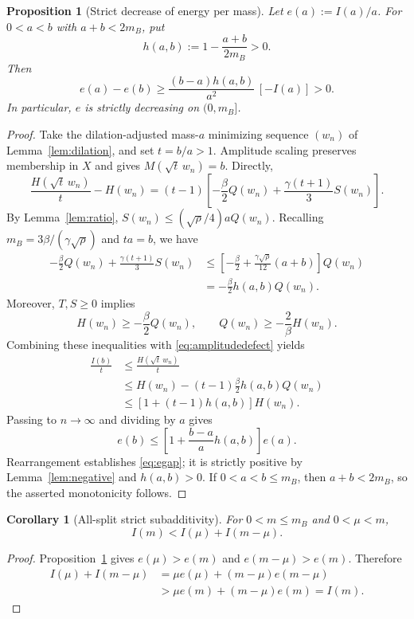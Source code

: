 \documentclass[11pt]{article}
\numberwithin{equation}{section}
\newtheorem{proposition}[theorem]{Proposition}
\newtheorem{corollary}[theorem]{Corollary}
\theoremstyle{remark}
\begin{document}
\begin{proposition}[Strict decrease of energy per mass]
\label{prop:decrease}
Let $e(a):=I(a)/a$.  For $0<a<b$ with $a+b<2m_B$,
put
\[
h(a,b):=1-\frac{a+b}{2m_B}>0.
\]
Then
\begin{equation}\label{eq:egap}
e(a)-e(b)\ge
\frac{(b-a)h(a,b)}{a^2}\,[-I(a)]>0.
\end{equation}
In particular, $e$ is strictly decreasing on $(0,m_B]$.
\end{proposition}
\begin{proof}
Take the dilation-adjusted mass-$a$ minimizing sequence $(w_n)$ of
Lemma~\ref{lem:dilation}, and set $t=b/a>1$.
Amplitude scaling preserves membership in $X$ and gives
$M(\sqrt t\,w_n)=b$.  Directly,
\begin{equation}\label{eq:amplitudedefect}
\frac{H(\sqrt t\,w_n)}{t}-H(w_n)
=(t-1)\left[-\frac{\beta}{2}Q(w_n)
+\frac{\gamma(t+1)}{3}S(w_n)\right].
\end{equation}
By Lemma~\ref{lem:ratio}, $S(w_n)\le (\sqrt\rho/4)aQ(w_n)$.
Recalling $m_B=3\beta/(\gamma\sqrt\rho)$ and $ta=b$, we have
\begin{align*}
-\frac{\beta}{2}Q(w_n)+\frac{\gamma(t+1)}3S(w_n)
&\le\left[-\frac{\beta}{2}
+\frac{\gamma\sqrt\rho}{12}(a+b)\right]Q(w_n)\\
&=-\frac{\beta}{2}h(a,b)Q(w_n).
\end{align*}
Moreover, $T,S\ge0$ implies
\[
H(w_n)\ge-\frac{\beta}{2}Q(w_n),
\qquad Q(w_n)\ge-\frac{2}{\beta}H(w_n).
\]
Combining these inequalities with \eqref{eq:amplitudedefect} yields
\begin{align*}
\frac{I(b)}{t}
&\le\frac{H(\sqrt t\,w_n)}{t}\\
&\le H(w_n)-(t-1)\frac{\beta}{2}h(a,b)Q(w_n)\\
&\le[1+(t-1)h(a,b)]H(w_n).
\end{align*}
Passing to $n\to\infty$ and dividing by $a$ gives
\[
e(b)\le\left[1+\frac{b-a}{a}h(a,b)\right]e(a).
\]
Rearrangement establishes \eqref{eq:egap}; it is strictly positive by
Lemma~\ref{lem:negative} and $h(a,b)>0$.
If $0<a<b\le m_B$, then $a+b<2m_B$, so the asserted monotonicity follows.
\end{proof}

\begin{corollary}[All-split strict subadditivity]\label{cor:binding}
For $0<m\le m_B$ and $0<\mu<m$,
\[
I(m)<I(\mu)+I(m-\mu).
\]
\end{corollary}
\begin{proof}
Proposition~\ref{prop:decrease} gives
$e(\mu)>e(m)$ and $e(m-\mu)>e(m)$.
Therefore
\begin{align*}
I(\mu)+I(m-\mu)
&=\mu e(\mu)+(m-\mu)e(m-\mu)\\
&>\mu e(m)+(m-\mu)e(m)=I(m).
\end{align*}
\end{proof}
\end{document}
